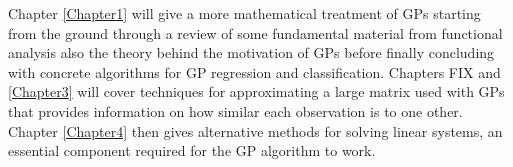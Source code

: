 Chapter \ref{Chapter1} will give a more mathematical treatment of GPs starting from the ground through a review of some fundamental material from functional analysis also the theory behind the motivation of GPs before finally concluding with concrete algorithms for GP regression and classification. Chapters FIX and \ref{Chapter3} will cover techniques for approximating a large matrix used with GPs that provides information on how similar each observation is to one other. Chapter \ref{Chapter4} then gives alternative methods for solving linear systems, an essential component required for the GP algorithm to work.

\newpage
{}
